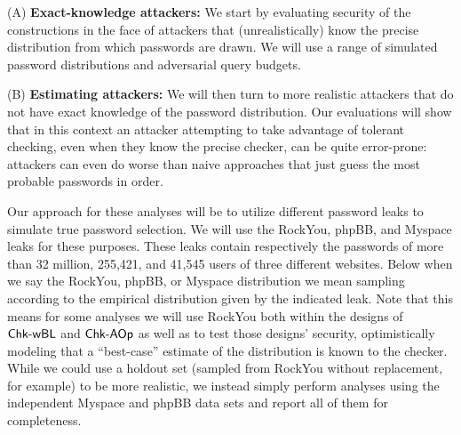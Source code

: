 \begin{newenum}
\item[(A)] {\bf Exact-knowledge attackers:} We start by evaluating security 
  of the constructions in the face of attackers that (unrealistically) 
  know the precise distribution from which passwords are drawn. We will use a
  range of simulated password distributions and adversarial query budgets.
\item[(B)] 
  {\bf Estimating attackers:} We will then turn to more realistic attackers that
  do not have exact knowledge of the
  password distribution. Our evaluations will show that in this context an attacker 
  attempting to take advantage of tolerant checking, even when they know the
  precise checker, can be quite error-prone: attackers can even do worse than
  naive approaches that just guess the most probable passwords in order.
\end{newenum}
Our approach for these analyses will be to utilize different password
leaks to simulate true password selection. We will use the RockYou,
phpBB, and Myspace leaks for these purposes. These leaks contain respectively the
passwords of more than 32 million, 255,421, and 41,545 users of
three different websites. Below when we say the RockYou, phpBB, or
Myspace distribution we mean sampling according to the empirical
distribution given by the indicated leak.
Note that this means for some analyses we will use RockYou 
both within the designs of 
$\textnormal{\textsf{Chk-wBL}}$ and $\textnormal{\textsf{Chk-AOp}}$ as well as to test those designs' security,
optimistically modeling that a ``best-case'' estimate of the distribution is known to
the checker. While we could use a holdout set (sampled from RockYou without
replacement, for example) to be more realistic, we instead simply perform 
analyses using the independent Myspace and phpBB data sets and report all of
them for completeness.



